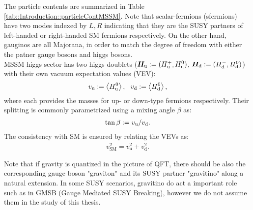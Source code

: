 The particle contents are summarized in Table \ref{tab::Introduction::particleContMSSM}. Note that scalar-fermions (sfermions) have two modes indexed by $L,R$ indicating that they are the SUSY partners of left-handed or right-handed SM fermions respectively. On the other hand, gauginos are all Majorana, in order to match the degree of freedom with either the patner gauge bosons and higgs bosons. \\

MSSM higgs sector has two higgs doublets ($\bm{H}_{\mathrm{u}} := (H_{\mathrm{u}}^+,H_{\mathrm{u}}^0)$, $\bm{H}_{\mathrm{d}} := (H_{\mathrm{d}}^-,H_{\mathrm{d}}^0)$) with their own vacuum expectation values (VEV):
\begin{align}
 v_{\mathrm{u}} :=  \left< H^0_{\mathrm{u}} \right>, \,\,\,\,  v_{\mathrm{d}} :=  \left< H^0_{\mathrm{d}} \right>, \nonumber
\end{align}
where each provides the masses for up- or down-type fermions respectively. Their splitting is commonly parametrized using a mixing angle $\beta$ as:
\begin{align}
\tan\beta := v_{\mathrm{u}}/v_{\mathrm{d}}.
\end{align}
The consistency with SM is ensured by relating the VEVs as: 
\begin{align}
v^2_{\mathrm{SM}} = v^2_{\mathrm{u}} + v^2_{\mathrm{d}}.
\end{align}

Note that if gravity is quantized in the picture of QFT, there should be also the corresponding gauge boson "graviton" and its SUSY partner "gravitino" along a natural extension. In some SUSY scenarios, gravitino do act a important role such as in GMSB (Gauge Mediated SUSY Breaking), however we do not assume them in the study of this thesis. \\


